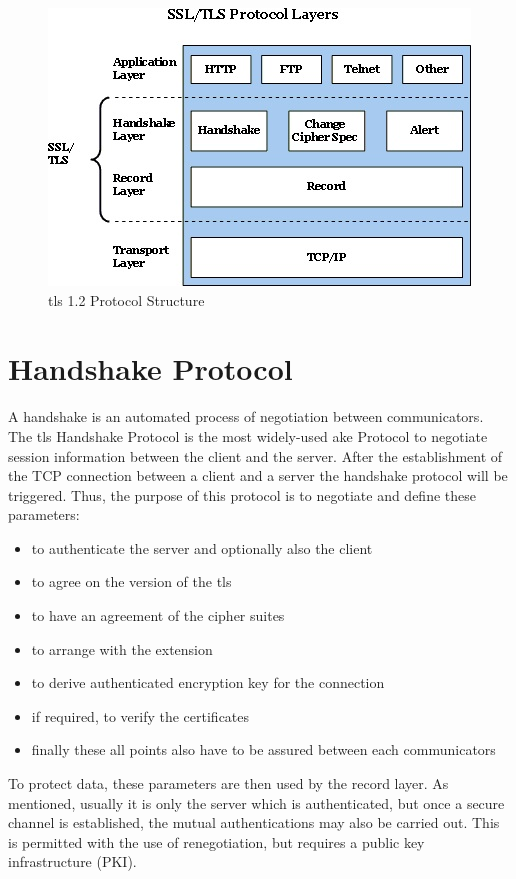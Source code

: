 \begin{figure}[H]
	\centering
		\includegraphics[scale=1]{images/tls_structure.jpg}
	\caption{\gls{tls} 1.2 Protocol Structure \cite{ms:overview}}
	\label{fig:tls_structure}
\end{figure}

\section{Handshake Protocol}
\label{sec:handshake_protocol}
 A handshake is an automated process of negotiation between communicators. The \gls{tls} Handshake Protocol is the most widely-used \gls{ake} Protocol to negotiate session information between the client and the server. 
 After the establishment of the TCP connection between a client and a server the handshake protocol will be triggered. 
 Thus, the purpose of this protocol is to negotiate and define these parameters:
 
 \begin{itemize}
\item to authenticate the server and optionally also the client
 \item to agree on the version of the \gls{tls}
 \item to have an agreement of the cipher suites
 \item to arrange with the extension
 \item to derive authenticated encryption key for the connection
 \item if required, to verify the certificates
 \item finally these all points also have to be assured between each communicators
\end{itemize}

To protect data, these parameters are then used by the record layer. As mentioned, usually it is only the server which is authenticated, but once a secure channel is established, the mutual authentications may also be carried out. This is permitted with the use of renegotiation, but requires a public key infrastructure (PKI). 
\cite{ms:overview}
\cite{ms:handshake}

